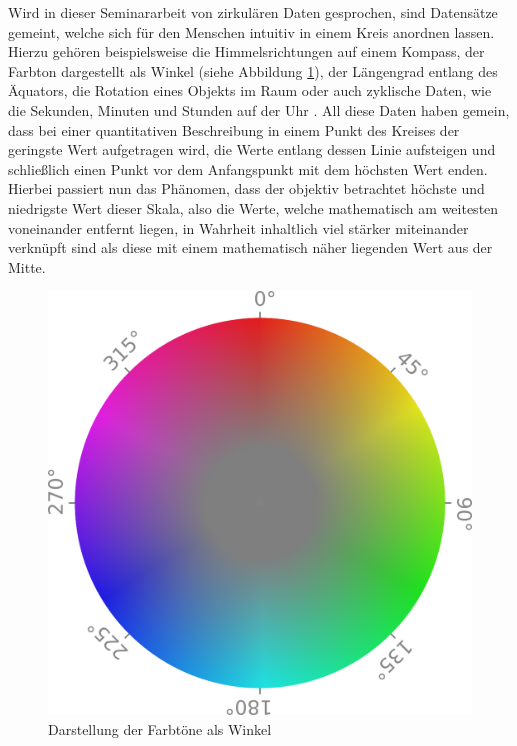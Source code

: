 \documentclass[
12pt, %
toc=listofnumbered, %
toc=chapterentrydotfill, %
numbers=noenddot, %
captions=tableheading, %
bibliography=numbered
]{scrreprt}
\begin{document}
Wird in dieser Seminararbeit von zirkulären Daten gesprochen, sind Datensätze gemeint, welche sich für den Menschen intuitiv in einem Kreis anordnen lassen. 
Hierzu gehören beispielsweise die Himmelsrichtungen auf einem Kompass, der Farbton dargestellt als Winkel (siehe Abbildung \ref{fig:colorcircle}), der Längengrad entlang des Äquators, die Rotation eines Objekts im Raum oder auch zyklische Daten, wie die Sekunden, Minuten und Stunden auf der Uhr \cite{2016_London_EncodingCyclicalContinuous}. 
All diese Daten haben gemein, dass bei einer quantitativen Beschreibung in einem Punkt des Kreises der geringste Wert aufgetragen wird, die Werte entlang dessen Linie aufsteigen und schließlich einen Punkt vor dem Anfangspunkt mit dem höchsten Wert enden. 
Hierbei passiert nun das Phänomen, dass der objektiv betrachtet höchste und niedrigste Wert dieser Skala, also die Werte, welche mathematisch am weitesten voneinander entfernt liegen, in Wahrheit inhaltlich viel stärker miteinander verknüpft sind als diese mit 
einem mathematisch näher liegenden Wert aus der Mitte. 

\begin{figure}[tph]
	\begin{center}
		\includegraphics[width=0.5\linewidth]{./images/colorcircle.png}
		\caption{Darstellung der Farbtöne als Winkel \cite{__Farbraum}}
		\label{fig:colorcircle}
	\end{center}
\end{figure}
\end{document}
